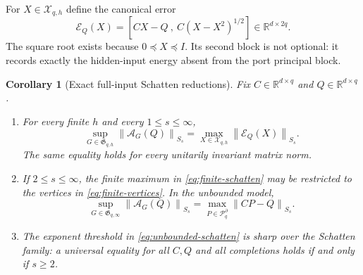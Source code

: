 \documentclass[11pt]{article}
\newtheorem{corollary}[theorem]{Corollary}
\theoremstyle{definition}
\theoremstyle{remark}
\newcommand{\R}{\mathbb R}
\newcommand{\cX}{\mathcal X}
\newcommand{\cP}{\mathcal P}
\newcommand{\cE}{\mathcal E}
\newcommand{\cA}{\mathcal A}
\newcommand{\fG}{\mathfrak G}
\newcommand{\norm}[1]{\left\lVert #1\right\rVert}
\begin{document}
For $X\in\cX_{q,h}$ define the canonical error
\begin{equation}
  \cE_Q(X)
  =\left[CX-Q\ ,\ C(X-X^2)^{1/2}\right]
  \in\R^{d\times2q}.
  \label{eq:canonical-error}
\end{equation}
The square root exists because $0\preceq X\preceq I$.  Its second block is
not optional: it records exactly the hidden-input energy absent from the port
principal block.

\begin{corollary}[Exact full-input Schatten reductions]
\label{cor:schatten}
Fix $C\in\R^{d\times q}$ and $Q\in\R^{d\times q}$.

\begin{enumerate}[label=\textup{(\roman*)},leftmargin=2.1em]
\item For every finite $h$ and every $1\leq s\leq\infty$,
\begin{equation}
  \sup_{G\in\fG_{q,h}}\norm{\cA_G(Q)}_{S_s}
  =\max_{X\in\cX_{q,h}}\norm{\cE_Q(X)}_{S_s}.
  \label{eq:finite-schatten}
\end{equation}
The same equality holds for every unitarily invariant matrix norm.

\item If $2\leq s\leq\infty$, the finite maximum in
\eqref{eq:finite-schatten} may be restricted to the vertices in
\eqref{eq:finite-vertices}.  In the unbounded model,
\begin{equation}
  \sup_{G\in\fG_{q,\infty}}\norm{\cA_G(Q)}_{S_s}
  =\max_{P\in\cP_q^\partial}\norm{CP-Q}_{S_s}.
  \label{eq:unbounded-schatten}
\end{equation}

\item The exponent threshold in \eqref{eq:unbounded-schatten} is sharp over
the Schatten family: a universal equality for all $C,Q$ and all completions
holds if and only if $s\geq2$.
\end{enumerate}
\end{corollary}
\end{document}
